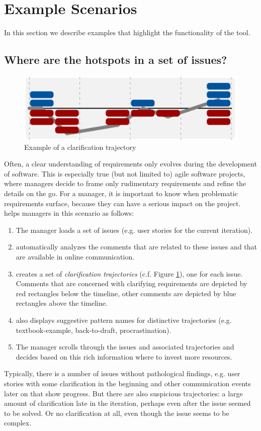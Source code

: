 \section{Example Scenarios}
In this section we describe examples that highlight the functionality of the \viss tool.

\subsection{Where are the hotspots in a set of issues?}
\begin{figure}[b]
\includegraphics[width=\columnwidth]{img/example-trajectory}
\caption{Example of a clarification trajectory}
\label{fig:example-trajectory}
\end{figure}
Often, a clear understanding of requirements only evolves during the development of software.
This is especially true (but not limited to) agile software projects, where managers decide to frame only rudimentary requirements and refine the details on the go.
For a manager, it is important to know when problematic requirements surface, because they can have a serious impact on the project.
\viss helps managers in this scenario as follows:
\begin{enumerate}
\item The manager loads a set of issues (e.g. user stories for the current iteration).
\item \viss automatically analyzes the comments that are related to these issues and that are available in online communication.  
\item \viss creates a set of \emph{clarification trajectories} (c.f. Figure \ref{fig:example-trajectory}), one for each issue. 
Comments that are concerned with clarifying requirements are depicted by red rectangles below the timeline, other comments are depicted by blue rectangles above the timeline.
\item \viss also displays suggestive pattern names for distinctive trajectories (e.g. textbook-example, back-to-draft, procrastination).
\item The manager scrolls through the issues and associated trajectories and decides based on this rich information where to invest more resources.
\end{enumerate}
Typically, there is a number of issues without pathological findings, e.g. user stories with some clarification in the beginning and other communication events later on that show progress. But there are also suspicious trajectories: a large amount of clarification late in the iteration, perhaps even after the issue seemed to be solved. 
Or no clarification at all, even though the issue seems to be complex.

